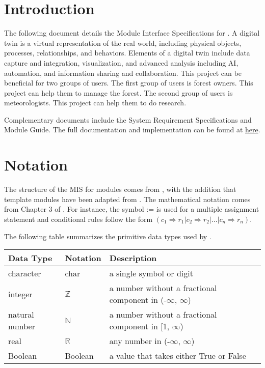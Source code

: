 \documentclass[12pt, titlepage]{article}
\begin{document}
\tableofcontents

\newpage


\section{Introduction}

The following document details the Module Interface 
Specifications for \progname{}. A digital twin is a virtual 
representation of the real world, including physical objects, 
processes, relationships, and behaviors. Elements of a 
digital twin include data capture
and integration, visualization, and advanced analysis 
including AI, automation, and information sharing and 
collaboration. This project can be beneficial for two groups 
of users.  The first group of users is forest owners. This 
project can help them to manage the forest. The second group 
of users is meteorologists. This project can help them to 
do research. 

\noindent Complementary documents include the System 
Requirement Specifications and Module Guide.  The full 
documentation and implementation can be
found at \href{https://github.com/wuj187/DigitalTwinCAS}
{here}. 

\section{Notation}

\noindent The structure of the MIS for modules comes from \citet{HoffmanAndStrooper1995},
with the addition that template modules have been adapted from
\cite{GhezziEtAl2003}.  The mathematical notation comes from 
Chapter 3 of
\citet{HoffmanAndStrooper1995}.  For instance, the symbol := 
is used for a multiple assignment statement and conditional 
rules follow the form $(c_1 \Rightarrow r_1 | c_2 \Rightarrow
r_2 | ... | c_n \Rightarrow r_n )$.

The following table summarizes the primitive data types used by \progname. 

\begin{center}
\renewcommand{\arraystretch}{1.2}
\noindent 
\begin{tabular}{l l p{7.5cm}} 
\toprule 
\textbf{Data Type} & \textbf{Notation} & \textbf{Description}\\ 
\midrule
character & char & a single symbol or digit\\
integer & $\mathbb{Z}$ & a number without a fractional component in (-$\infty$, $\infty$) \\
natural number & $\mathbb{N}$ & a number without a fractional component in [1, $\infty$) \\
real & $\mathbb{R}$ & any number in (-$\infty$, $\infty$)\\
Boolean & Boolean & a value that takes either True or False\\
\bottomrule
\end{tabular} 
\end{center}
\end{document}
